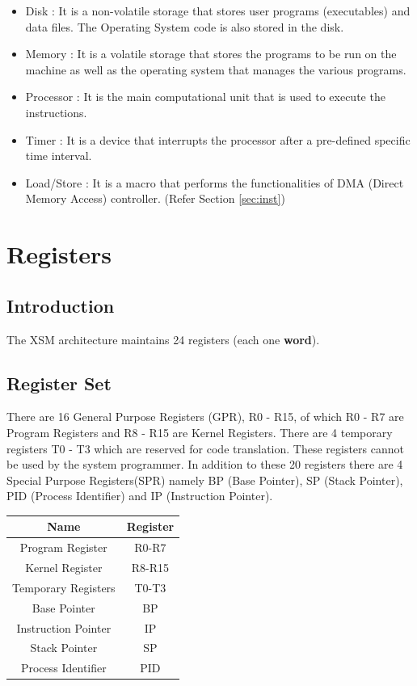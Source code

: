 \documentclass[11pt]{article}
\begin{document}
\begin{itemize}
\item Disk : It is a non-volatile storage that stores user programs (executables) and data files. The Operating System code is also stored in the disk.

\item Memory : It is a volatile storage that stores the programs to be run on the machine as well as the operating system that manages the various programs.
\item Processor : It is the main computational unit that is used to execute the instructions.
\item Timer : It is a device that interrupts the processor after a pre-defined specific time interval.
\item Load/Store : It is a macro that performs the functionalities of DMA (Direct Memory Access) controller. (Refer Section \ref{sec:inst})
\end{itemize}






\section{Registers}

\subsection{Introduction}
The XSM architecture maintains 24 registers (each one \textbf{word}).

\subsection{Register Set}
There are 16 General Purpose Registers (GPR), R0 - R15, of which R0 - R7 are Program Registers and R8 - R15 are Kernel Registers. There are 4 temporary registers T0 - T3 which are reserved for code translation. These registers cannot be used by the system programmer. In addition to these 20 registers there are 4 Special Purpose Registers(SPR) namely BP (Base Pointer), SP (Stack Pointer), PID (Process Identifier) and IP (Instruction Pointer).


\begin{center}
\begin{tabular}{|c|c|}
\hline Name & Register \\ 
\hline Program Register & R0-R7 \\ 
\hline Kernel Register & R8-R15 \\ 
\hline Temporary Registers & T0-T3 \\ 
\hline Base Pointer & BP \\ 
\hline Instruction Pointer & IP \\ 
\hline Stack Pointer & SP \\ 
\hline Process Identifier & PID \\
\hline
\end{tabular} 
\end{center}
\end{document}
